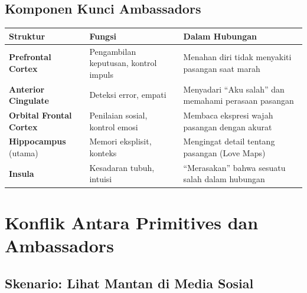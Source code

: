 \subsection{Komponen Kunci Ambassadors}

\begin{center}
\renewcommand{\arraystretch}{1.5}
\begin{tabular}{|>{\raggedright}p{3.5cm}|>{\raggedright}p{5cm}|>{\raggedright\arraybackslash}p{6.5cm}|}
\hline
\rowcolor{sagegreen!20}
\textbf{Struktur} & \textbf{Fungsi} & \textbf{Dalam Hubungan} \\
\hline
\textbf{Prefrontal Cortex} & Pengambilan keputusan, kontrol impuls & Menahan diri tidak menyakiti pasangan saat marah \\
\hline
\textbf{Anterior Cingulate} & Deteksi error, empati & Menyadari ``Aku salah'' dan memahami perasaan pasangan \\
\hline
\textbf{Orbital Frontal Cortex} & Penilaian sosial, kontrol emosi & Membaca ekspresi wajah pasangan dengan akurat \\
\hline
\textbf{Hippocampus} (utama) & Memori eksplisit, konteks & Mengingat detail tentang pasangan (Love Maps) \\
\hline
\textbf{Insula} & Kesadaran tubuh, intuisi & ``Merasakan'' bahwa sesuatu salah dalam hubungan \\
\hline
\end{tabular}
\end{center}

\section{Konflik Antara Primitives dan Ambassadors}

\subsection{Skenario: Lihat Mantan di Media Sosial}

